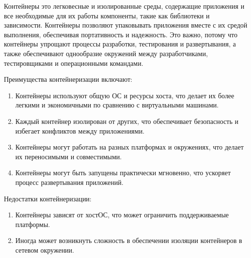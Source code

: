\documentclass[letterpaper,10pt,russian]{sphinxmanual}
\begin{document}
\sphinxAtStartPar
{}

\sphinxAtStartPar
Контейнеры \sphinxhyphen{} это легковесные и изолированные среды, содержащие приложения и все необходимые для их работы компоненты, такие как библиотеки и зависимости. Контейнеры позволяют упаковывать приложения вместе с их средой выполнения, обеспечивая портативность и надежность. Это важно, потому что контейнеры упрощают процессы разработки, тестирования и развертывания, а также обеспечивают однообразие окружений между разработчиками, тестировщиками и операционными командами.

\sphinxAtStartPar
{}

\sphinxAtStartPar
Преимущества контейнеризации включают:
\begin{enumerate}
%
\item {} 
\sphinxAtStartPar
{} Контейнеры используют общую ОС и ресурсы хоста, что делает их более легкими и экономичными по сравнению с виртуальными машинами.

\item {} 
\sphinxAtStartPar
{} Каждый контейнер изолирован от других, что обеспечивает безопасность и избегает конфликтов между приложениями.

\item {} 
\sphinxAtStartPar
{} Контейнеры могут работать на разных платформах и окружениях, что делает их переносимыми и совместимыми.

\item {} 
\sphinxAtStartPar
{} Контейнеры могут быть запущены практически мгновенно, что ускоряет процесс развертывания приложений.

\end{enumerate}

\sphinxAtStartPar
Недостатки контейнеризации:
\begin{enumerate}
%
\item {} 
\sphinxAtStartPar
{} Контейнеры зависят от хост\sphinxhyphen{}ОС, что может ограничить поддерживаемые платформы.

\item {} 
\sphinxAtStartPar
{} Иногда может возникнуть сложность в обеспечении изоляции контейнеров в сетевом окружении.

\end{enumerate}
\end{document}
